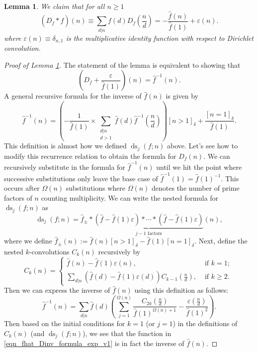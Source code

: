 \documentclass[12pt,reqno,a4letter]{article}
\numberwithin{figure}{section}
\numberwithin{table}{section}
\numberwithin{equation}{section}
\newcommand{\undersetbrace}[2]{\underset{\displaystyle{#1}}{\underbrace{#2}}}
\newcommand{\Iverson}[1]{\ensuremath{\left[#1\right]_{\delta}}}
\DeclareMathOperator{\ds}{ds}
\theoremstyle{plain}
\newtheorem{lemma}[theorem]{Lemma}
\numberwithin{theorem}{section}
\theoremstyle{definition}
\begin{document}
\begin{lemma} 
\label{lemma_Dastfhat} 
We claim that for all $n \geq 1$
\[
(D_f \ast \widehat{f})(n) \equiv \sum_{d|n} f(d) D_f\left(\frac{n}{d}\right) = 
     -\frac{\widehat{f}(n)}{\widehat{f}(1)} + \varepsilon(n). 
\]
where $\varepsilon(n) \equiv \delta_{n,1}$ is the multiplicative identity function 
with respect to Dirichlet convolution. 
\end{lemma} 
\begin{proof}[Proof of Lemma \ref{lemma_Dastfhat}]
The statement of the lemma is equivalent to showing that 
\begin{equation} 
\label{eqn_fhat_Dinv_formula_exp_v1} 
\left(D_f + \frac{\varepsilon}{\widehat{f}(1)}\right)(n) = \widehat{f}^{-1}(n). 
\end{equation} 
A general recursive formula for the inverse of $\widehat{f}(n)$ is given by 
\cite{APOSTOLANUMT} 
\[
\widehat{f}^{-1}(n) = \left(-\frac{1}{\widehat{f}(1)} \times \sum_{\substack{d|n \\ d > 1}} 
     \widehat{f}(d) \widehat{f}^{-1}\left(\frac{n}{d}\right)\right) 
     \Iverson{n > 1} + \frac{\Iverson{n = 1}}{\widehat{f}(1)}. 
\]
This definition is almost how we defined $\ds_j(f; n)$ above. Let's see how to modify this 
recurrence relation to obtain the formula for $D_f(n)$. 
We can recursively substitute in the formula for $\widehat{f}^{-1}(n)$ until we hit the 
point where successive substitutions only leave the base case of 
$\widehat{f}^{-1}(1) = \widehat{f}(1)^{-1}$. This occurs after $\Omega(n)$ substitutions 
where $\Omega(n)$ denotes the number of prime factors of $n$ counting multiplicity. 
We can write the nested formula for $\ds_j(f; n)$ as 
\[
\ds_j(f; n) = \widehat{f}_{\pm} \ast 
\undersetbrace{j-1\text{ factors}}{\left(\widehat{f}-\widehat{f}(1) \varepsilon\right) 
     \ast \cdots 
     \ast \left(\widehat{f}-\widehat{f}(1) \varepsilon\right)}(n), 
\]
where we define 
$\widehat{f}_{\pm}(n) := \widehat{f}(n) \Iverson{n > 1} - \widehat{f}(1) \Iverson{n = 1}$. 
Next, define the nested $k$-convolutions $C_k(n)$ recursively by 
\label{page_eqn_Ckn_kCvls} 
\[
C_k(n) = \begin{cases} 
     \widehat{f}(n) - \widehat{f}(1)\varepsilon(n), & \text{ if $k = 1$; } \\ 
     \sum\limits_{d|n} \left(\widehat{f}(d) - \widehat{f}(1) \varepsilon(d)\right) 
     C_{k-1}\left(\frac{n}{d}\right), & \text{ if $k \geq 2$. } 
     \end{cases} 
\] 
Then we can express the inverse of $\widehat{f}(n)$ using this definition as follows: 
\[
\widehat{f}^{-1}(n) = \sum_{d|n} \widehat{f}(d)\left( 
     \sum_{j=1}^{\Omega(n)} \frac{C_{2k}\left(\frac{n}{d}\right)}{\widehat{f}(1)^{\Omega(n)+1}} - 
     \frac{\varepsilon\left(\frac{n}{d}\right)}{\widehat{f}(1)^2}\right). 
\]
Then based on the initial conditions for $k = 1$ (or $j = 1$) in the definitions of 
$C_k(n)$ (and $\ds_j(f; n)$), we see that the function in 
\eqref{eqn_fhat_Dinv_formula_exp_v1} is in fact the inverse of $\widehat{f}(n)$. 
\end{proof} 
\end{document}
